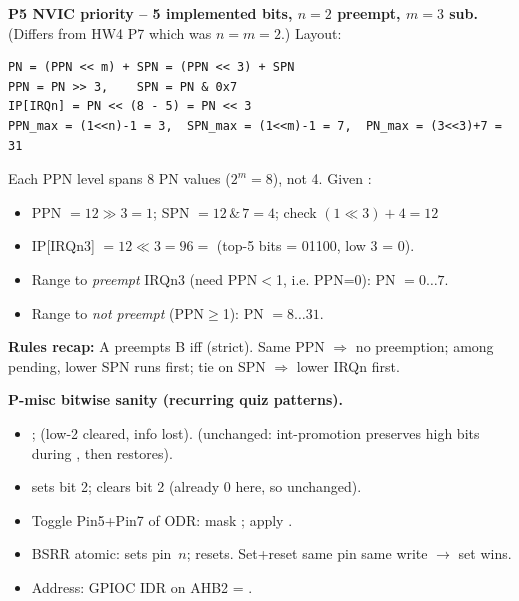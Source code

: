 \begin{qp}\textbf{P5 NVIC priority -- 5 implemented bits, $n{=}2$ preempt, $m{=}3$ sub.} (Differs from HW4 P7 which was $n{=}m{=}2$.) Layout:
\begin{lstlisting}[language={}]
PN = (PPN << m) + SPN = (PPN << 3) + SPN
PPN = PN >> 3,    SPN = PN & 0x7
IP[IRQn] = PN << (8 - 5) = PN << 3
PPN_max = (1<<n)-1 = 3,  SPN_max = (1<<m)-1 = 7,  PN_max = (3<<3)+7 = 31
\end{lstlisting}
Each PPN level spans 8 PN values ($2^m=8$), not 4. Given :
\begin{itemize}
\item PPN $= 12 \gg 3 = 1$; SPN $= 12 \,\&\, 7 = 4$; check $(1\!\ll\!3)+4=12$ \checkmark
\item IP[IRQn3] $= 12 \ll 3 = 96 = $  (top-5 bits = 01100, low 3 = 0).
\item Range to \emph{preempt} IRQn3 (need PPN$<$1, i.e. PPN=0): PN $= 0\ldots 7$.
\item Range to \emph{not preempt} (PPN$\ge$1): PN $= 8\ldots 31$.
\end{itemize}
\textbf{Rules recap:} A preempts B iff  (strict). Same PPN $\Rightarrow$ no preemption; among pending, lower SPN runs first; tie on SPN $\Rightarrow$ lower IRQn first.\end{qp}

\begin{qp}\textbf{P-misc bitwise sanity (recurring quiz patterns).}
\begin{itemize}
\item {};  (low-2 cleared, info lost).  (unchanged: int-promotion preserves high bits during \cee{<<}, then \cee{>>} restores).
\item {} sets bit 2;  clears bit 2 (already 0 here, so unchanged).
\item Toggle Pin5+Pin7 of ODR: mask ; apply .
\item BSRR atomic:  sets pin~$n$;  resets. Set+reset same pin same write $\to$ set wins.
\item Address: GPIOC IDR on AHB2 = .
\end{itemize}\end{qp}

